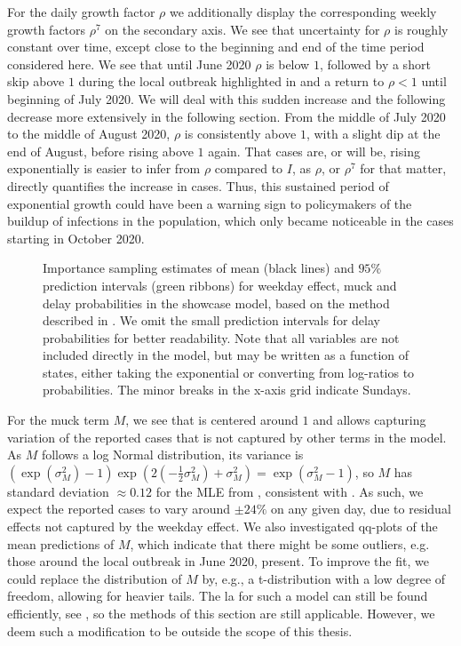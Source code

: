 For the daily growth factor $\rho$ we additionally display the corresponding weekly growth factors $\rho^{7}$ on the secondary axis. We see that uncertainty for $\rho$ is roughly constant over time, except close to the beginning and end of the time period considered here. We see that until June 2020 $\rho$ is below $1$, followed by a short skip above $1$ during the local outbreak highlighted in  and a return to $\rho < 1$ until beginning of July 2020. We will deal with this sudden increase and the following decrease more extensively in the following section. From the middle of July 2020 to the middle of August 2020, $\rho$ is consistently above $1$, with a slight dip at the end of August, before rising above $1$ again. That cases are, or will be, rising exponentially is easier to infer from $\rho$ compared to $I$, as $\rho$, or $\rho^7$ for that matter, directly quantifies the increase in cases. Thus, this sustained period of exponential growth could have been a warning sign to policymakers of the buildup of infections in the population, which only became noticeable in the cases starting in October 2020. 

\begin{figure}
    \resizebox{\textwidth}{!}{%
    }
    \caption{Importance sampling estimates of mean (black lines) and $95\%$ prediction intervals (green ribbons) for weekday effect, \glqq{}muck\grqq{} and delay probabilities in the showcase model, based on the method described in . We omit the small prediction intervals for delay probabilities for better readability. Note that all variables are not included directly in the model, but may be written as a function of states, either taking the exponential or converting from log-ratios to probabilities. The minor breaks in the x-axis grid indicate Sundays.} \label{fig:showcase_prediction_intervals}
\end{figure}

For the muck term $M$, we see that is centered around $1$ and allows capturing variation of the reported cases that is not captured by other terms in the model. As $M$ follows a log Normal distribution, its variance is $\left( \exp \left( \sigma^{2}_M \right) - 1 \right) \exp \left( 2 (- \frac{1}{2} \sigma^{2}_M) +\sigma^{2}_M \right) = \exp \left( \sigma^{2}_M - 1\right)$, so $M$ has standard deviation $\approx 0.12$ for the MLE from , consistent with . As such, we expect the reported cases to vary around $\pm 24\%$ on any given day, due to residual effects not captured by the weekday effect. We also investigated qq-plots of the mean predictions of $M$, which indicate that there might be some outliers, e.g. those around the local outbreak in June 2020, present. To improve the fit, we could replace the distribution of $M$ by, e.g., a t-distribution with a low degree of freedom, allowing for heavier tails. The \acrshort{la} for such a model can still be found efficiently, see \citep[Section 11.7.2]{Durbin2012Time}, so the methods of this section are still applicable. However, we deem such a modification to be outside the scope of this thesis. 

